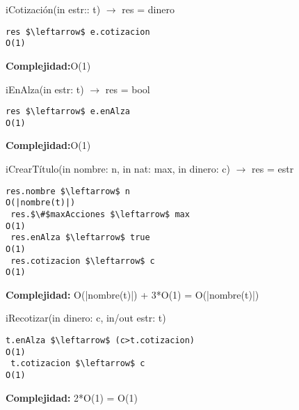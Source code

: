iCotizaci\'on(in estr:: t) $\rightarrow$ res = dinero
\begin{lstlisting}[mathescape]
 res $\leftarrow$ e.cotizacion                                                    O(1)
\end{lstlisting}
\textbf{Complejidad:}O(1)


iEnAlza(in estr: t) $\rightarrow$ res = bool
\begin{lstlisting}[mathescape]
 res $\leftarrow$ e.enAlza                                                        O(1)
\end{lstlisting}
\textbf{Complejidad:}O(1)


iCrearT\'itulo(in nombre: n, in nat: max, in dinero: c) $\rightarrow$ res = estr
\begin{lstlisting}[mathescape]
 res.nombre $\leftarrow$ n                                                        O(|nombre(t)|)
 res.$\#$maxAcciones $\leftarrow$ max                                                 O(1)
 res.enAlza $\leftarrow$ true                                                     O(1)
 res.cotizacion $\leftarrow$ c                                                    O(1)
\end{lstlisting}
\textbf{Complejidad:} O(|nombre(t)|) + 3*O(1) = O(|nombre(t)|)


iRecotizar(in dinero: c, in/out estr: t)
\begin{lstlisting}[mathescape]
 t.enAlza $\leftarrow$ (c>t.cotizacion)                                           O(1)
 t.cotizacion $\leftarrow$ c                                                      O(1)
\end{lstlisting}
\textbf{Complejidad:} 2*O(1) = O(1)
